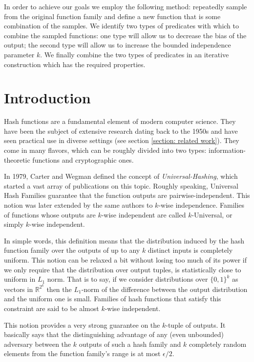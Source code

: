 \documentclass[12pt]{article}
\newcommand{\zo}[1]{\{0,1\}^{#1}}
\begin{document}
	In order to achieve our goals we employ the following method: repeatedly sample from the original function family and define a new function that is some combination of the samples.
	We identify two types of predicates with which to combine the sampled functions: one type will allow us to decrease the bias of the output; the second type will allow us to increase the bounded independence parameter $k$.
	We finally combine the two types of predicates in an iterative construction which has the required properties.

\newpage

\tableofcontents

\newpage

\section{Introduction}
	
	Hash functions are a fundamental element of modern computer science.
	They have been the subject of extensive research dating back to the 1950s and have seen practical use in diverse settings (see section \ref{section: related work}).
	They come in many flavors, which can be roughly divided into two types: information-theoretic functions and cryptographic ones.
	
	In 1979, Carter and Wegman \cite{Original} defined the concept of \emph{Universal-Hashing}, which started a vast array of publications on this topic.
	Roughly speaking, Universal Hash Families guarantee that the function outputs are pairwise-independent.
	This notion was later extended by the same authors to $k$-wise independence.
	Families of functions whose outputs are $k$-wise independent are called $k$-Universal, or simply $k$-wise independent.
	
	In simple words, this definition means that the distribution induced by the hash function family over the outputs of up to any $k$ distinct inputs is completely uniform.
	This notion can be relaxed a bit without losing too much of its power if we only require that the distribution over output tuples, is statistically close to uniform in $L_1$ norm.
	That is to say, if we consider distributions over $\zo{k}$ as vectors in $\mathbb{R}^{2^k}$ then the $L_1$-norm of the difference between the output distribution and the uniform one is small.
	Families of hash functions that satisfy this constraint are said to be almost $k$-wise independent.
	
	This notion provides a very strong guarantee on the $k$-tuple of outputs.
	It basically says that the distinguishing advantage of any (even unbounded) adversary between the $k$ outputs of such a hash family and $k$ completely random elements from the function family's range is at most $\epsilon/2$.
	
\end{document}
